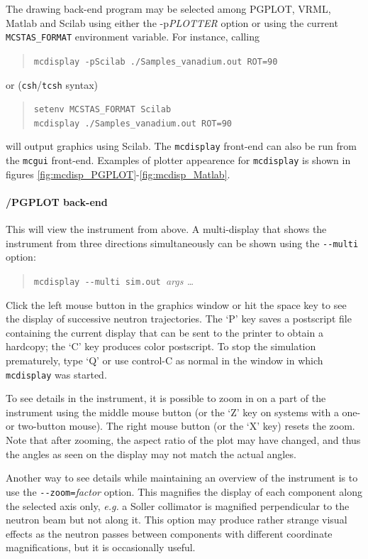   
 The drawing back-end program may be selected among
PGPLOT, VRML, Matlab and Scilab using either the -p{\it PLOTTER} option or using
the current \verb+MCSTAS_FORMAT+ environment variable.  For instance, calling
\begin{quote}
  \verb+mcdisplay -pScilab ./Samples_vanadium.out ROT=90+
\end{quote}
or (\verb+csh+/\verb+tcsh+ syntax)
\begin{quote}
  \verb+setenv MCSTAS_FORMAT Scilab+\\
  \verb+mcdisplay ./Samples_vanadium.out ROT=90+
\end{quote}
will output graphics using Scilab.
The \verb+mcdisplay+ front-end can also be run from the \verb+mcgui+ front-end.
Examples of plotter appearence for \verb+mcdisplay+ is shown in figures
 \ref{fig:mcdisp_PGPLOT}-\ref{fig:mcdisp_Matlab}.

\paragraph{\MCS /PGPLOT back-end}

This will view the instrument from above. A multi-display that shows the
instrument from three directions simultaneously can be shown using the
\verb+--multi+ option:
\begin{quote}
  \verb+mcdisplay --multi sim.out +{\it args \ldots}
\end{quote}

Click the left mouse button in the graphics window or hit the space key to see
the display of successive neutron trajectories. The `P' key saves a postscript
file containing the current display that can be sent to the printer to obtain a
hardcopy; the `C' key produces color postscript.  To stop the simulation
prematurely, type `Q' or use control-C as normal in the window in which
\verb+mcdisplay+ was started.

To see details in the instrument, it is possible to zoom in on a part of the
instrument using the middle mouse button (or the `Z' key on systems with a one-
or two-button mouse). The right mouse button (or the `X' key) resets the
zoom. Note that after zooming, the aspect ratio of the plot may have changed,
and thus the angles as seen on the display may not match the actual angles.

Another way to see details while maintaining an overview of the instrument is to
use the \verb+--zoom=+\textit{factor} option. This magnifies the display of each
component along the selected axis only, {\em e.g.} a Soller collimator is
magnified perpendicular to the neutron beam but not along it. This option may
produce rather strange visual effects as the neutron passes between components
with different coordinate magnifications, but it is occasionally useful.

